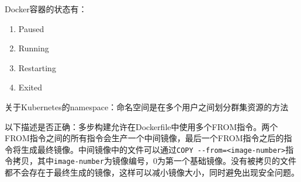 \begin{problem}
	Docker容器的状态有：
    \vspace{-0.8em}
    \begin{multicols}{4}
        \begin{enumerate}[label=\Alph*.]
            \item Paused
            \item Running
            \item Restarting
            \item Exited
        \end{enumerate}
    \end{multicols}
    \vspace{-1em}
\end{problem}



\begin{problem}
	关于Kubernetes的namespace：命名空间是在多个用户之间划分群集资源的方法
\end{problem}



\begin{problem}
    以下描述是否正确：多步构建允许在Dockerfile中使用多个FROM指令。两个FROM指令之间的所有指令会生产一个中间镜像，最后一个FROM指令之后的指令将生成最终镜像。中间镜像中的文件可以通过\verb|COPY --from=<image-number>|指令拷贝，其中\verb|image-number|为镜像编号，0为第一个基础镜像。没有被拷贝的文件都不会存在于最终生成的镜像，这样可以减小镜像大小，同时避免出现安全问题。
\end{problem}



